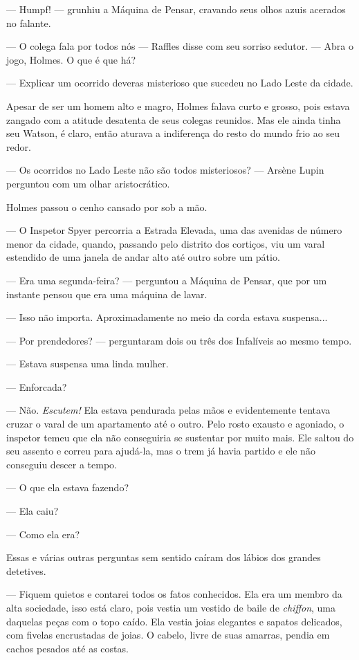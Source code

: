--- Humpf! --- grunhiu a Máquina de Pensar, cravando seus olhos azuis
acerados no falante.

--- O colega fala por todos nós --- Raffles disse com seu sorriso
sedutor. --- Abra o jogo, Holmes. O que é que há?

--- Explicar um ocorrido deveras misterioso que sucedeu no Lado Leste da
cidade.

Apesar de ser um homem alto e magro, Holmes falava curto e grosso, pois
estava zangado com a atitude desatenta de seus colegas reunidos. Mas ele
ainda tinha seu Watson, é claro, então aturava a indiferença do resto do
mundo frio ao seu redor.

--- Os ocorridos no Lado Leste não são todos misteriosos? --- Arsène
Lupin perguntou com um olhar aristocrático.

Holmes passou o cenho cansado por sob a mão.

--- O Inspetor Spyer percorria a Estrada Elevada, uma das avenidas de
número menor da cidade, quando, passando pelo distrito dos cortiços, viu
um varal estendido de uma janela de andar alto até outro sobre um pátio.

--- Era uma segunda-feira? --- perguntou a Máquina de Pensar, que por um
instante pensou que era uma máquina de lavar.

--- Isso não importa. Aproximadamente no meio da corda estava
suspensa...

--- Por prendedores? --- perguntaram dois ou três dos Infalíveis ao
mesmo tempo.

--- Estava suspensa uma linda mulher.

--- Enforcada?

--- Não. \emph{Escutem!} Ela estava pendurada pelas mãos e evidentemente
tentava cruzar o varal de um apartamento até o outro. Pelo rosto exausto
e agoniado, o inspetor temeu que ela não conseguiria se sustentar por
muito mais. Ele saltou do seu assento e correu para ajudá-la, mas o trem
já havia partido e ele não conseguiu descer a tempo.

--- O que ela estava fazendo?

--- Ela caiu?

--- Como ela era?

Essas e várias outras perguntas sem sentido caíram dos lábios dos
grandes detetives.

--- Fiquem quietos e contarei todos os fatos conhecidos. Ela era um
membro da alta sociedade, isso está claro, pois vestia um vestido de
baile de \emph{chiffon}, uma daquelas peças com o topo caído. Ela vestia
joias elegantes e sapatos delicados, com fivelas encrustadas de joias. O
cabelo, livre de suas amarras, pendia em cachos pesados até as costas.

